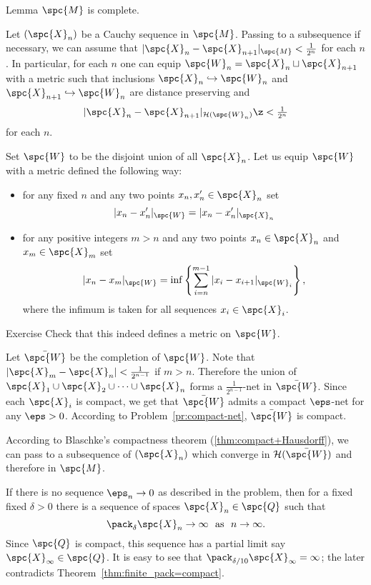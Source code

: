 \begin{thm}{Lemma}
$\spc{M}$ is complete.
\end{thm}

Let $(\spc{X}_n)$ be a Cauchy sequence in $\spc{M}$.
Passing to a subsequence if necessary, 
we can assume that $|\spc{X}_n-\spc{X}_{n+1}|_{\spc{M}}<\tfrac1{2^n}$ for each $n$.
In particular, for each $n$ one can equip $\spc{W}_n=\spc{X}_n \sqcup \spc{X}_{n+1}$ with a metric such that
inclusions $\spc{X}_n\hookrightarrow \spc{W}_n$ and $\spc{X}_{n+1}\hookrightarrow \spc{W}_n$ are distance preserving
and $$|\spc{X}_n-\spc{X}_{n+1}|_{\mathcal{H}(\spc{W}_n)}\z<\tfrac1{2^n}$$
for each $n$.

Set $\spc{W}$ to be the disjoint union of all $\spc{X}_n$.
Let us equip $\spc{W}$ with a metric defined the following way:
\begin{itemize}
\item for any fixed $n$ and any two points $x_n,x_n'\in \spc{X}_n$ set
$$|x_n-x_n'|_{\spc{W}}=|x_n-x_n'|_{\spc{X}_n}$$
\item for any positive integers $m>n$ and any two points $x_n\in \spc{X}_n$ and $x_m\in \spc{X}_m$ set
$$|x_n-x_m|_{\spc{W}}=\inf\left\{\sum_{i=n}^{m-1}|x_i-x_{i+1}|_{\spc{W}_i}\right\},$$
where the infimum is taken for all sequences $x_i\in \spc{X}_i$.
\end{itemize}

\begin{thm}{Exercise}
Check that this indeed defines a metric on $\spc{W}$.
\end{thm}

Let $\bar{\spc{W}}$ be the completion of $\spc{W}$.
Note that $|\spc{X}_m-\spc{X}_n|<\tfrac1{2^{n-1}}$ if $m>n$.
Therefore the union of $\spc{X}_1\cup \spc{X}_2\cup\dots\cup \spc{X}_n$ forms a $\tfrac1{2^{n-1}}$-net in $\bar{\spc{W}}$.
Since each $\spc{X}_i$ is compact, we get that $\bar{\spc{W}}$ admits a compact $\eps$-net for any $\eps>0$.
According to Problem~\ref{pr:compact-net}, $\bar{\spc{W}}$ is compact.

According to Blaschke's compactness theorem (\ref{thm:compact+Hausdorff}),
we can pass to a subsequence of $(\spc{X}_n)$ which converge in $\mathcal{H}(\bar{\spc{W}})$ and therefore in $\spc{M}$.
\qeds

If there is no sequence $\eps_n\to0$ as described in the problem, then for a fixed fixed $\delta>0$
there is a sequence of spaces $\spc{X}_n\in\spc{Q}$ such that $$\pack_\delta \spc{X}_n\to\infty\ \ \text{as}\ \  n\to\infty.$$
Since $\spc{Q}$ is compact, 
this sequence has a partial limit say $\spc{X}_\infty\in\spc{Q}$.
It is easy to see that $\pack_{\delta/10} \spc{X}_\infty=\infty$;
the later contradicts Theorem~\ref{thm:finite_pack=compact}.

